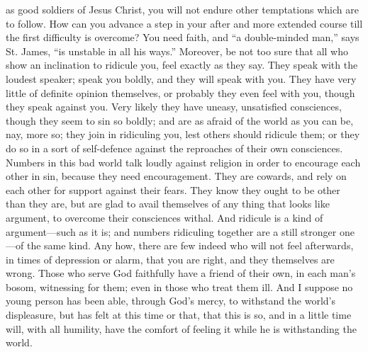 as good soldiers of Jesus Christ, you will not endure other
temptations which are to follow. How can you advance a step in your
after and more extended course till the first difficulty is overcome?
You need faith, and ``a double-minded man,'' says St. James,
``is unstable in all his ways.'' Moreover, be not too sure
that all who show an inclination to ridicule you, feel exactly as they
say. They speak with the loudest speaker; speak you boldly, and they
will speak with you. They have very little of definite opinion
themselves, or probably they even feel with you, though they speak
against you. Very likely they have uneasy, unsatisfied consciences,
though they seem to sin so boldly; and are as afraid of the world as
you can be, nay, more so; they join in ridiculing you, lest others
should ridicule them; or they do so in a sort of self-defence against
the reproaches of their own consciences. Numbers in this bad world
talk loudly against religion in order to encourage each other in sin,
because they need encouragement. They are cowards, and rely on each
other for support against their fears. They know they ought to be
other than they are, but are glad to avail themselves of any thing
that looks like argument, to overcome their consciences withal. And
ridicule is a kind of argument—such as it is; and numbers ridiculing
together are a still stronger one—of the same kind. Any how, there
are few indeed who will not feel afterwards, in times of depression or
alarm, that you are right, and they themselves are wrong. Those who
serve God faithfully have a friend of their own, in each man's bosom,
witnessing for them; even in those who treat them ill. And I suppose
no young person has been able, through God's mercy, to withstand the
world's displeasure, but has felt at this time or that, that this is
so, and in a little time will, with all humility, have the comfort of
feeling it while he is withstanding the world.

